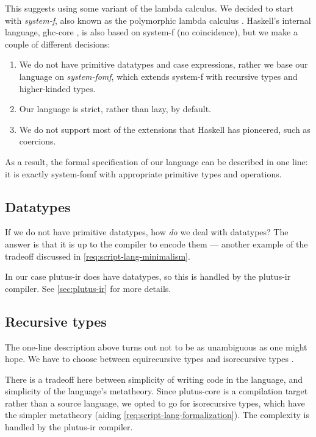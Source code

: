 This suggests using some variant of the lambda calculus.
We decided to start with \emph{\gls{system-f}}, also known as the polymorphic lambda calculus \autocite{Girard-thesis}.
Haskell's internal language, \gls{ghc-core} \parencite{jones1998transformation}, is also based on \gls{system-f} (no coincidence), but we make a couple of different decisions:
\begin{enumerate}
  \item We do not have primitive datatypes and case expressions, rather we base our language on \emph{\gls{system-fomf}}, which extends \gls{system-f} with recursive types and higher-kinded types.
  \item Our language is strict, rather than lazy, by default.
  \item We do not support most of the extensions that Haskell has pioneered, such as coercions.
\end{enumerate}

As a result, the formal specification of our language can be described in one line: it is exactly \gls{system-fomf} with appropriate primitive types and operations.


\subsection{Datatypes}
If we do not have primitive datatypes, how \emph{do} we deal with datatypes?
The answer is that it is up to the compiler to encode them --- another example of the tradeoff discussed in \cref{req:script-lang-minimalism}.

In our case \gls{plutus-ir} does have datatypes, so this is handled by the \gls{plutus-ir} compiler. See \cref{sec:plutus-ir} for more details.

\subsection{Recursive types}

The one-line description above turns out not to be as unambiguous as one might hope. We have
to choose between equirecursive types and isorecursive types \autocite[chapter 21]{pierce2002types}.

There is a tradeoff here between simplicity of writing code in the language, and simplicity of the language's metatheory.
Since \gls{plutus-core} is a compilation target rather than a source language, we opted to go for isorecursive types, which have the simpler metatheory (aiding \cref{req:script-lang-formalization}).
The complexity is handled by the \gls{plutus-ir} compiler.

